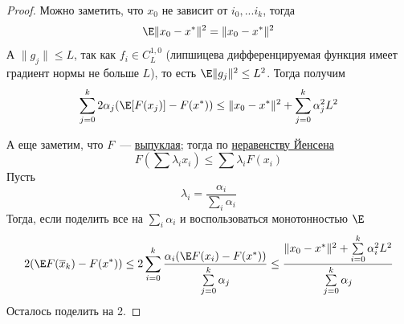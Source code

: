 \begin{proof}
  Можно заметить, что $x_0$ не зависит от $i_0,...i_k$, тогда
  \[
  \E \|x_0 - x^{*}\|^2 = \|x_0 - x^{*}\|^2
  \]
  А $\|g_j\| \le L$, так как $f_{i} \in C_L^{1,0}$ (липшицева дифференцируемая функция имеет градиент нормы не больше $L$), то есть $\E\|g_j\|^2 \le L^2$. Тогда получим
  \[
  \sum\limits_{j=0}^k
  2\alpha_j( \E[F(x_j)] - F(x^{*})) \le
   \|x_0 -x^{*}\|^2 + \sum\limits_{j=0}^k \alpha^2_j L^2
  \]

  А еще заметим, что $F$~--- \hyperref[note:1CA14F2C-637F-41DE-9E97-72075D19E97F]{выпуклая}; тогда по \hyperref[note:53558BAA-700E-46BE-9EAB-6A2F65A5B4C0]{неравенству Йенсена}
  \[
  F(\sum \lambda_ix_i) \le \sum \lambda_i F(x_i)
  \]
  Пусть
  \[
  \lambda_i = \frac{\alpha_i}{\sum\limits_i \alpha_i}
  \]
  Тогда, если поделить все на $\sum\limits_i \alpha_i$ и воспользоваться монотонностью $\E$
  \[
  2 ( \E F(\overline{x}_k) - F(x^{*})) \le 2 \sum\limits_{i=0}^k \frac{\alpha_i (\E F(x_i) - F(x^{*}))}{\sum\limits_{j=0}^k \alpha_j} \le \frac{\|x_0 - x^{*}\|^2 + \sum\limits_{i=0}^k \alpha_i^2 L^2}{ \sum\limits_{j=0}^k \alpha_j}
  \]
  Осталось поделить на 2.
\end{proof}
